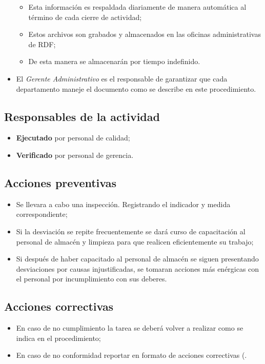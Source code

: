 \begin{itemize}
	\begin{itemize}
		\item Esta información es respaldada diariamente de manera automática al término de cada cierre de actividad;
		\item Estos archivos son grabados y almacenados en las oficinas administrativas de \gls{RDF};
		\item De esta manera se almacenarán por tiempo indefinido.
	\end{itemize}
	\item El \emph{Gerente Administrativo} es el responsable de garantizar que cada departamento maneje el documento como se describe en este procedimiento.
\end{itemize}

\subsection{Responsables de la actividad}
\begin{itemize}
	\item \textbf{Ejecutado} por personal de calidad;
	\item \textbf{Verificado} por personal de gerencia.
\end{itemize}

\subsection{Acciones preventivas}
\begin{itemize}
	\item Se llevara a cabo una inspección. Registrando el indicador y medida correspondiente;
	\item Si la desviación se repite frecuentemente se dará curso de capacitación al personal de almacén y limpieza para que realicen eficientemente su trabajo;
	\item Si después de haber capacitado al personal de almacén se siguen presentando desviaciones por causas injustificadas, se tomaran acciones más enérgicas con el personal por incumplimiento con sus deberes.
\end{itemize}

\subsection{Acciones correctivas}
\begin{itemize}
	\item En caso de no cumplimiento la tarea se deberá volver a realizar como se indica en el procedimiento;
	\item En caso de no conformidad reportar en formato de acciones correctivas (\RAC.
\end{itemize}

